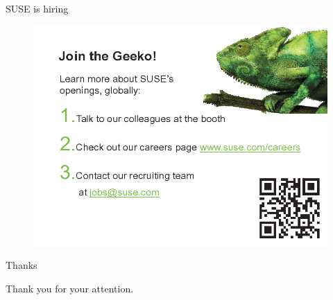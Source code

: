 \documentclass{beamer}
\begin{document}
\begin{frame}{SUSE is hiring}
  \begin{figure}
    \includegraphics[width=0.8\linewidth]{suse_hiring.png}
  \end{figure}
\end{frame}

\begin{frame}{Thanks}
  \begin{center}
    Thank you for your attention.
  \end{center}
\end{frame}
\end{document}
